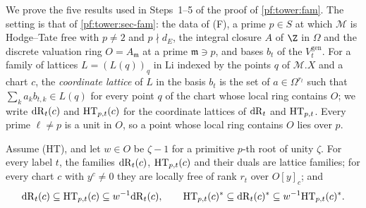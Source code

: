 We prove the five results used in Steps~1--5 of the proof of \cref{pf:tower:fam}. The setting is that of
\cref{pf:tower:sec-fam}: the data of (F), a prime $p\in S$ at which $\mathcal M$ is Hodge--Tate free with $p\ne2$ and
$p\nmid d_E$, the integral closure $A$ of $\Z$ in $\Omega$ and the discrete valuation ring $O=A_{\mathfrak m}$ at a prime
$\mathfrak m\ni p$, and bases $b_t$ of the $V^{\mathrm{gen}}_t$. For a family of lattices $L=(L(q))_q$ in $\mathrm{Li}$ indexed by
the points $q$ of $\mathcal M.X$ and a chart $c$, the \emph{coordinate lattice} of $L$ in the basis $b_t$ is the set of
$a\in\Omega^{r_t}$ such that $\sum_ka_kb_{t,k}\in L(q)$ for every point $q$ of the chart whose local ring contains $O$; we write
$\mathrm{dR}_t(c)$ and $\mathrm{HT}_{p,t}(c)$ for the coordinate lattices of $\mathrm{dR}_t$ and $\mathrm{HT}_{p,t}$. Every prime $\ell\ne p$ is a
unit in $O$, so a point whose local ring contains $O$ lies over $p$.

\begin{lemma}\label{pf:tower:mpbound}
Assume \textup{(HT)}, and let $w\in O$ be $\zeta-1$ for a primitive $p$-th root of unity $\zeta$. For every label $t$, the
families $\mathrm{dR}_t(c)$, $\mathrm{HT}_{p,t}(c)$ and their duals are lattice families; for every chart $c$ with $y^c\ne0$ they
are locally free of rank $r_t$ over $O[y]_c$; and
\[
\mathrm{dR}_t(c)\subseteq\mathrm{HT}_{p,t}(c)\subseteq w^{-1}\mathrm{dR}_t(c),\qquad
\mathrm{HT}_{p,t}(c)^*\subseteq\mathrm{dR}_t(c)^*\subseteq w^{-1}\mathrm{HT}_{p,t}(c)^*.
\]
\end{lemma}

